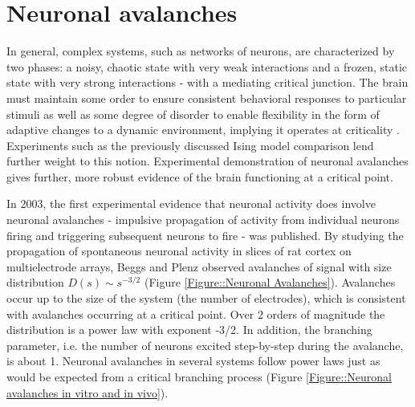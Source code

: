 \documentclass[12pt]{article}
\begin{document}
\section*{Neuronal avalanches}

In general, complex systems, such as networks of neurons, are characterized by two phases: a noisy, chaotic state with very weak interactions and a frozen, static state with very strong interactions - with a mediating critical junction. The brain must maintain some order to ensure consistent behavioral responses to particular stimuli as well as some degree of disorder to enable flexibility in the form of adaptive changes to a dynamic environment, implying it operates at criticality \cite{Bak1987a}. Experiments such as the previously discussed Ising model comparison lend further weight to this notion. Experimental demonstration of neuronal avalanches gives further, more robust evidence of the brain functioning at a critical point.

In 2003, the first experimental evidence that neuronal activity does involve neuronal avalanches - impulsive propagation of activity from individual neurons firing and triggering subsequent neurons to fire - was published\cite{Beggs2003b}. By studying the propagation of spontaneous neuronal activity in slices of rat cortex on multielectrode arrays, Beggs and Plenz observed avalanches of signal with size distribution $ D(s) \sim s^{-3/2} $ (Figure \ref{Figure::Neuronal Avalanches}). Avalanches occur up to the size of the system (the number of electrodes), which is consistent with avalanches occurring at a critical point. Over 2 orders of magnitude the distribution is a power law with exponent -3/2. In addition, the branching parameter, i.e. the number of neurons excited step-by-step during the avalanche, is about 1. Neuronal avalanches in several systems follow power laws just as would be expected from a critical branching process (Figure \ref{Figure::Neuronal avalanches in vitro and in vivo}).
   
\end{document}
